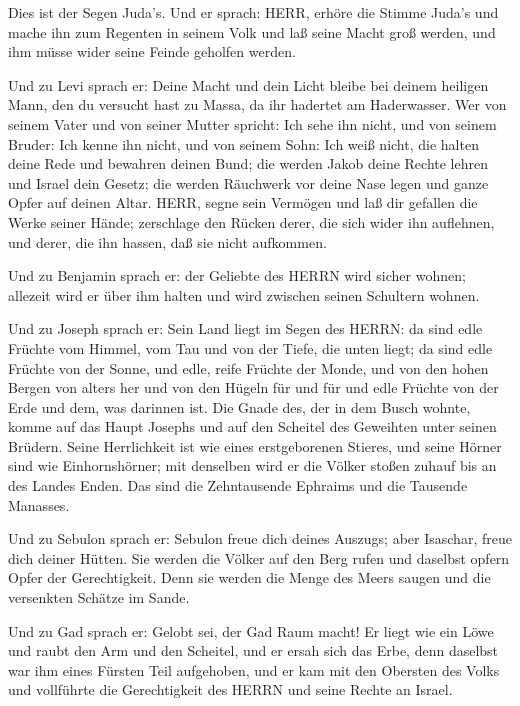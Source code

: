  Dies ist der Segen Juda's. Und er sprach: HERR, erhöre die
Stimme Juda's und mache ihn zum Regenten in seinem Volk und laß seine
Macht groß werden, und ihm müsse wider seine Feinde geholfen werden.

 Und zu Levi sprach er: Deine Macht und dein Licht bleibe
bei deinem heiligen Mann, den du versucht hast zu Massa, da ihr hadertet
am Haderwasser.  Wer von seinem Vater und von seiner Mutter
spricht: Ich sehe ihn nicht, und von seinem Bruder: Ich kenne ihn nicht,
und von seinem Sohn: Ich weiß nicht, die halten deine Rede und bewahren
deinen Bund;  die werden Jakob deine Rechte lehren und
Israel dein Gesetz; die werden Räuchwerk vor deine Nase legen und ganze
Opfer auf deinen Altar.  HERR, segne sein Vermögen und laß
dir gefallen die Werke seiner Hände; zerschlage den Rücken derer, die
sich wider ihn auflehnen, und derer, die ihn hassen, daß sie nicht
aufkommen.

 Und zu Benjamin sprach er: der Geliebte des HERRN wird
sicher wohnen; allezeit wird er über ihm halten und wird zwischen seinen
Schultern wohnen.

 Und zu Joseph sprach er: Sein Land liegt im Segen des
HERRN: da sind edle Früchte vom Himmel, vom Tau und von der Tiefe, die
unten liegt;  da sind edle Früchte von der Sonne, und edle,
reife Früchte der Monde,  und von den hohen Bergen von
alters her und von den Hügeln für und für  und edle Früchte
von der Erde und dem, was darinnen ist. Die Gnade des, der in dem Busch
wohnte, komme auf das Haupt Josephs und auf den Scheitel des Geweihten
unter seinen Brüdern.  Seine Herrlichkeit ist wie eines
erstgeborenen Stieres, und seine Hörner sind wie Einhornshörner; mit
denselben wird er die Völker stoßen zuhauf bis an des Landes Enden. Das
sind die Zehntausende Ephraims und die Tausende Manasses.

 Und zu Sebulon sprach er: Sebulon freue dich deines
Auszugs; aber Isaschar, freue dich deiner Hütten.  Sie
werden die Völker auf den Berg rufen und daselbst opfern Opfer der
Gerechtigkeit. Denn sie werden die Menge des Meers saugen und die
versenkten Schätze im Sande.

 Und zu Gad sprach er: Gelobt sei, der Gad Raum macht! Er
liegt wie ein Löwe und raubt den Arm und den Scheitel,  und
er ersah sich das Erbe, denn daselbst war ihm eines Fürsten Teil
aufgehoben, und er kam mit den Obersten des Volks und vollführte die
Gerechtigkeit des HERRN und seine Rechte an Israel.

